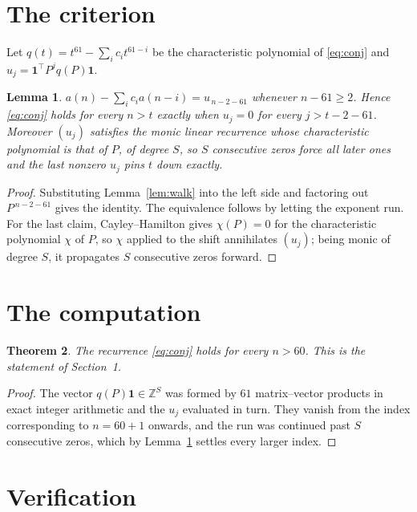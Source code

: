 \documentclass[11pt,a4paper]{article}
\theoremstyle{plain}
\newtheorem{theorem}{Theorem}
\newtheorem{lemma}[theorem]{Lemma}
\theoremstyle{definition}
\begin{document}
\section{The criterion}

Let $q(t)=t^{61}-\sum_i c_i t^{61-i}$ be the characteristic polynomial of
\eqref{eq:conj} and $u_j=\mathbf{1}^{\!\top}P^{j}q(P)\mathbf{1}$.

\begin{lemma}\label{lem:crit}
$a(n)-\sum_i c_i a(n-i)=u_{\,n-2-61}$ whenever $n-61\ge2$. Hence
\eqref{eq:conj} holds for every $n>t$ exactly when $u_j=0$ for every
$j>t-2-61$. Moreover $(u_j)$ satisfies the monic linear recurrence whose
characteristic polynomial is that of $P$, of degree $S$, so $S$ consecutive zeros force all
later ones and the last nonzero $u_j$ pins $t$ down exactly.
\end{lemma}

\begin{proof}
Substituting Lemma~\ref{lem:walk} into the left side and factoring out
$P^{\,n-2-61}$ gives the identity. The equivalence follows by letting the exponent
run. For the last claim, Cayley--Hamilton gives $\chi(P)=0$ for the characteristic
polynomial $\chi$ of $P$, so $\chi$ applied to the shift annihilates $(u_j)$; being monic of
degree $S$, it propagates $S$ consecutive zeros forward.
\end{proof}

\section{The computation}

\begin{theorem}
The recurrence \eqref{eq:conj} holds for every $n>60$. This is the statement of
Section~1.
\end{theorem}

\begin{proof}
The vector $q(P)\mathbf{1}\in\mathbb{Z}^{S}$ was formed by $61$ matrix--vector
products in exact integer arithmetic and the $u_j$ evaluated in turn. They vanish from the
index corresponding to $n=60+1$ onwards, and the run was continued past $S$ consecutive
zeros, which by Lemma~\ref{lem:crit} settles every larger index.
\end{proof}

\section{Verification}
\end{document}
